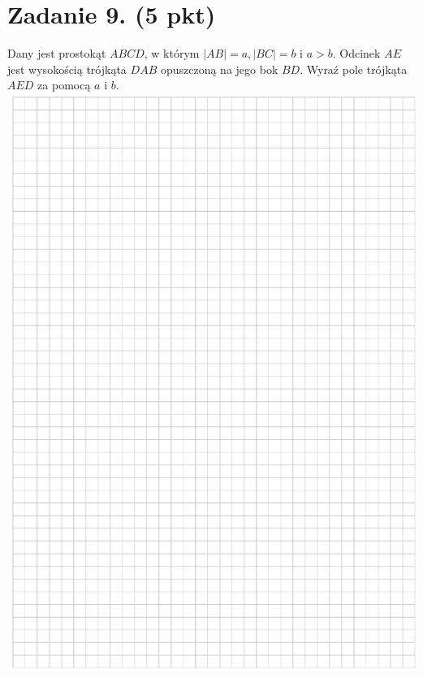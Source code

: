 \documentclass[10pt]{article}
\begin{document}
\section*{Zadanie 9. (5 pkt)}
Dany jest prostokąt \(A B C D\), w którym \(|A B|=a,|B C|=b\) i \(a>b\). Odcinek \(A E\) jest wysokością trójkąta \(D A B\) opuszczoną na jego bok \(B D\). Wyraź pole trójkąta \(A E D\) za pomocą \(a\) i \(b\).\\
\includegraphics[max width=\textwidth, center]{2024_11_21_606d6e4e152fe3e9f6feg-14}\\
\end{document}
